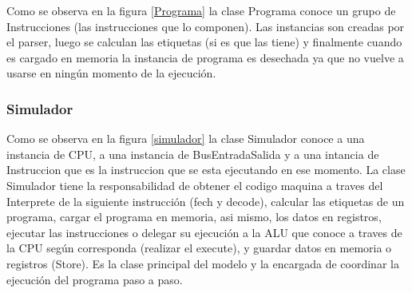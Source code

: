 Como se observa en la figura \ref{Programa} la clase Programa conoce un grupo de Instrucciones (las instrucciones que lo componen). Las instancias son creadas por el parser, luego se calculan las etiquetas (si es que las tiene) y finalmente cuando es cargado en memoria la instancia de programa es desechada ya que no vuelve a usarse en ningún momento de la ejecución.


\subsubsection{Simulador}

Como se observa en la figura \ref{simulador} la clase Simulador conoce a una instancia de CPU, a una instancia de BusEntradaSalida y a una intancia de Instruccion que es la instruccion que se esta ejecutando en ese momento.
La clase Simulador tiene la responsabilidad de obtener el codigo maquina a traves del Interprete de la siguiente instrucción (fech y decode), calcular las etiquetas de un programa, cargar el programa en memoria, asi mismo, los datos en registros,  ejecutar las instrucciones o delegar su ejecución a la ALU que conoce a traves de la CPU según corresponda (realizar el execute), y guardar datos en memoria o registros (Store).
Es la clase principal del modelo y la encargada de coordinar la ejecución del programa paso a paso. 







